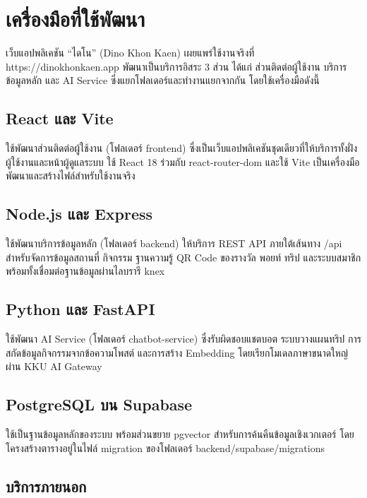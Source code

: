 \clearpage
\enlargethispage{3\baselineskip}
\section{เครื่องมือที่ใช้พัฒนา}

เว็บแอปพลิเคชัน ``ไดโน'' (Dino Khon Kaen) เผยแพร่ใช้งานจริงที่ https://dinokhonkaen.app พัฒนาเป็นบริการอิสระ 3 ส่วน ได้แก่ ส่วนติดต่อผู้ใช้งาน บริการข้อมูลหลัก และ AI Service ซึ่งแยกโฟลเดอร์และทำงานแยกจากกัน โดยใช้เครื่องมือดังนี้

\subsection{React และ Vite}

ใช้พัฒนาส่วนติดต่อผู้ใช้งาน (โฟลเดอร์ frontend) ซึ่งเป็นเว็บแอปพลิเคชันชุดเดียวที่ให้บริการทั้งฝั่งผู้ใช้งานและหน้าผู้ดูแลระบบ ใช้ React 18 ร่วมกับ react-router-dom และใช้ Vite เป็นเครื่องมือพัฒนาและสร้างไฟล์สำหรับใช้งานจริง

\subsection{Node.js และ Express}

ใช้พัฒนาบริการข้อมูลหลัก (โฟลเดอร์ backend) ให้บริการ REST API ภายใต้เส้นทาง /api สำหรับจัดการข้อมูลสถานที่ กิจกรรม ฐานความรู้ QR Code ของรางวัล พอยท์ ทริป และระบบสมาชิก พร้อมทั้งเชื่อมต่อฐานข้อมูลผ่านไลบรารี knex

\subsection{Python และ FastAPI}

ใช้พัฒนา AI Service (โฟลเดอร์ chatbot-service) ซึ่งรับผิดชอบแชตบอต ระบบวางแผนทริป การสกัดข้อมูลกิจกรรมจากข้อความโพสต์ และการสร้าง Embedding โดยเรียกโมเดลภาษาขนาดใหญ่ผ่าน KKU AI Gateway

\subsection{PostgreSQL บน Supabase}

ใช้เป็นฐานข้อมูลหลักของระบบ พร้อมส่วนขยาย pgvector สำหรับการค้นคืนข้อมูลเชิงเวกเตอร์ โดยโครงสร้างตารางอยู่ในไฟล์ migration ของโฟลเดอร์ backend/supabase/migrations

\subsection{บริการภายนอก}

